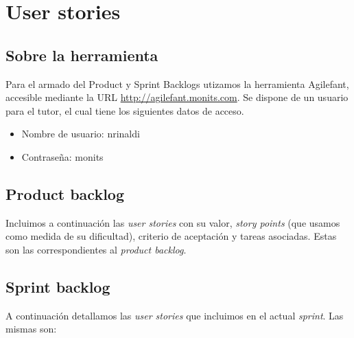 \documentclass[10pt, a4paper,english,spanish]{article}
\begin{document}

\maketitle
\pagebreak

\tableofcontents
\pagebreak

\section{User stories}

\subsection{Sobre la herramienta}

Para el armado del Product y Sprint Backlogs utizamos la herramienta Agilefant,
accesible mediante la URL \url{http://agilefant.monits.com}. Se
dispone de un usuario para el tutor, el cual tiene los siguientes datos de acceso.

\begin{itemize}
	\item Nombre de usuario: nrinaldi
	\item Contrase\~na: monits
\end{itemize}

\subsection{Product backlog}

Incluimos a continuaci\'on las \textit{user stories} con su valor, \textit{story points} (que usamos
como medida de su dificultad), criterio de aceptaci\'on y tareas asociadas. Estas son las 
correspondientes al \textit{product backlog}.



\subsection{Sprint backlog}

A continuaci\'on detallamos las \textit{user stories} que incluimos en el actual \textit{sprint}. Las
mismas son:
\end{document}
